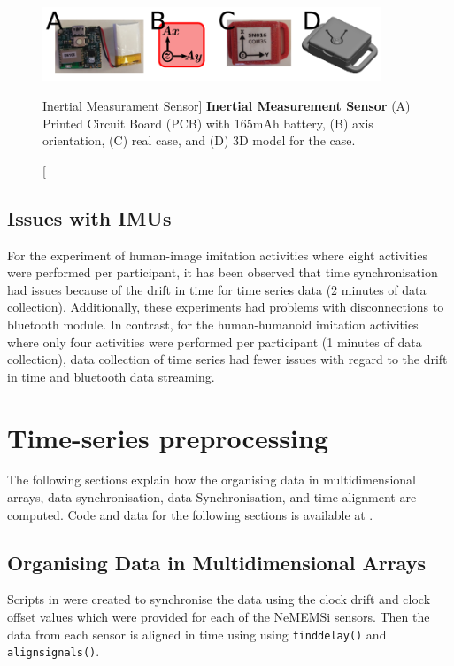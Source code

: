 \begin{figure}
 \centering
   \includegraphics[width=0.9\textwidth]{muse}
   \caption
	[Inertial Measurament Sensor]{
	{\bf Inertial Measurement Sensor}
		(A) Printed Circuit Board (PCB) with 165mAh battery,
		(B) axis orientation, 
		(C) real case, and 
		(D) 3D model for the case.
}
   \label{fig:muse}
\end{figure}

\subsection{Issues with IMUs} \label{appendix:imus:issues}
For the experiment of human-image imitation activities where eight activities 
were performed per participant, it has been observed that time 
synchronisation had issues because of the drift in time for time series data
(2 minutes of data collection).
Additionally, these experiments
had problems with disconnections to bluetooth module. 
In contrast, for the human-humanoid imitation activities
where only four activities were performed per participant 
(1 minutes of data collection), 
data collection of time series had fewer issues with regard 
to the drift in time and bluetooth data streaming.  


\section{Time-series preprocessing} \label{appendix:b:tps}

The following sections explain how the 
organising data in multidimensional arrays,
data synchronisation, data Synchronisation, and 
time alignment are computed. 
Code and data for the following sections is available at
.

\subsection{Organising Data in Multidimensional Arrays}
Scripts in \MATLAB were created to synchronise the data using the clock 
drift and clock offset values which were provided for each of the 
NeMEMSi sensors. Then the data from each sensor is aligned in 
time using using \texttt{finddelay()} and \texttt{alignsignals()}.

